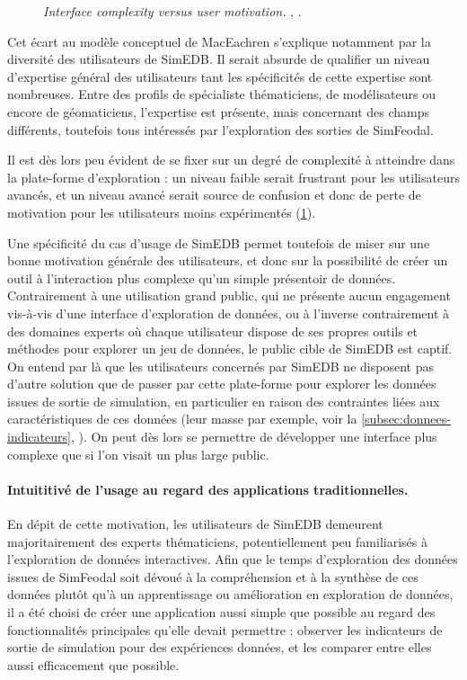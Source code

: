 \begin{figure}[H]
\begin{minipage}[t]{.46\linewidth}
		\caption{\og \textit{Interface complexity versus user motivation. }\fg{}, \cite[79]{roth_interactive_2013}.}
		\label{fig:interface-complexity}
	\end{minipage}
	\medskip
\end{figure}

Cet écart au modèle conceptuel de MacEachren s'explique notamment par la diversité des utilisateurs de SimEDB.
Il serait absurde de qualifier un niveau d'expertise général des utilisateurs tant les spécificités de cette expertise sont nombreuses.
Entre des profils de spécialiste thématiciens, de modélisateurs ou encore de géomaticiens, l'expertise est présente, mais concernant des champs différents, toutefois tous intéressés par l'exploration des sorties de SimFeodal.

Il est dès lors peu évident de se fixer sur un degré de complexité à atteindre dans la plate-forme d'exploration : un niveau faible serait frustrant pour les utilisateurs avancés, et un niveau avancé serait source de confusion et donc de perte de motivation pour les utilisateurs moins expérimentés (\cref{fig:interface-complexity}).

Une spécificité du cas d'usage de SimEDB permet toutefois de miser sur une bonne motivation générale des utilisateurs, et donc sur la possibilité de créer un outil à l'interaction plus complexe qu'un simple présentoir de données.
Contrairement à une utilisation grand public, qui ne présente aucun engagement vis-à-vis d'une interface d'exploration de données, ou à l'inverse contrairement à des domaines experts où chaque utilisateur dispose de ses propres outils et méthodes pour explorer un jeu de données, le public cible de SimEDB est \og captif\fg{}.
On entend par là que les utilisateurs concernés par SimEDB ne disposent pas d'autre solution que de passer par cette plate-forme pour explorer les données issues de sortie de simulation, en particulier en raison des contraintes liées aux caractéristiques de ces données (leur masse par exemple, voir la \cref{subsec:donnees-indicateurs}, ).
On peut dès lors se permettre de développer une interface plus complexe que si l'on visait un plus large public.

\paragraph{Intuititivé de l'usage au regard des applications traditionnelles.}

En dépit de cette motivation, les utilisateurs de SimEDB demeurent majoritairement des experts thématiciens, potentiellement peu familiarisés à l'exploration de données interactives.
Afin que le temps d'exploration des données issues de SimFeodal soit dévoué à la compréhension et à la synthèse de ces données plutôt qu'à un apprentissage ou amélioration en exploration de données, il a été choisi de créer une application aussi simple que possible au regard des fonctionnalités principales qu'elle devait permettre : observer les indicateurs de sortie de simulation pour des expériences données, et les comparer entre elles aussi efficacement que possible.

